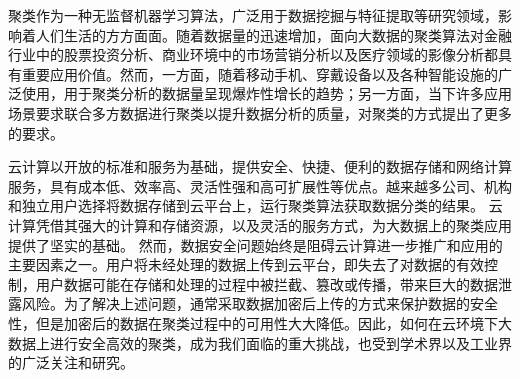 \begin{cabstract}
%

聚类作为一种无监督机器学习算法，广泛用于数据挖掘与特征提取等研究领域，影响着人们生活的方方面面。随着数据量的迅速增加，面向大数据的聚类算法对金融行业中的股票投资分析、商业环境中的市场营销分析以及医疗领域的影像分析都具有重要应用价值。然而，一方面，随着移动手机、穿戴设备以及各种智能设施的广泛使用，用于聚类分析的数据量呈现爆炸性增长的趋势；另一方面，当下许多应用场景要求联合多方数据进行聚类以提升数据分析的质量，对聚类的方式提出了更多的要求。

云计算以开放的标准和服务为基础，提供安全、快捷、便利的数据存储和网络计算服务，具有成本低、效率高、灵活性强和高可扩展性等优点。越来越多公司、机构和独立用户选择将数据存储到云平台上，运行聚类算法获取数据分类的结果。
云计算凭借其强大的计算和存储资源，以及灵活的服务方式，为大数据上的聚类应用提供了坚实的基础。
然而，数据安全问题始终是阻碍云计算进一步推广和应用的主要因素之一。用户将未经处理的数据上传到云平台，即失去了对数据的有效控制，用户数据可能在存储和处理的过程中被拦截、篡改或传播，带来巨大的数据泄露风险。为了解决上述问题，通常采取数据加密后上传的方式来保护数据的安全性，但是加密后的数据在聚类过程中的可用性大大降低。因此，如何在云环境下大数据上进行安全高效的聚类，成为我们面临的重大挑战，也受到学术界以及工业界的广泛关注和研究。


\end{cabstract}
